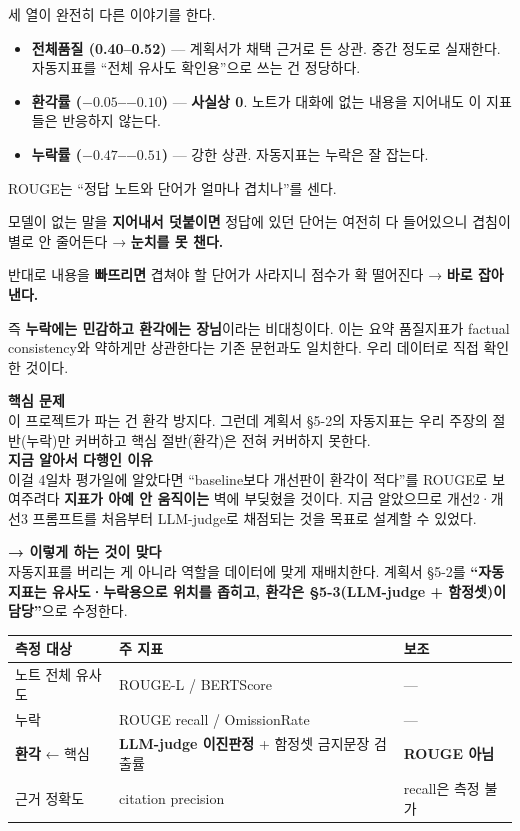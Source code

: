 \documentclass[10.5pt,a4paper]{article}
\newcommand{\proposal}[1]{%
\begin{tcolorbox}[enhanced, breakable, colback=softgray, boxrule=0pt, frame hidden,
  borderline west={3pt}{0pt}{navy}, arc=0pt,
  left=12pt, right=10pt, top=8pt, bottom=8pt, before skip=12pt, after skip=8pt,
  before upper={\setlength{\parskip}{0.7em}\setlength{\parindent}{0pt}}]
{\bfseries\color{navy}→ 이렇게 하는 것이 맞다}\\[3pt]#1
\end{tcolorbox}}
\newcommand{\keybox}[1]{%
\begin{tcolorbox}[enhanced, breakable, colback=white, boxrule=1pt, colframe=accent, arc=1pt,
  left=11pt, right=10pt, top=8pt, bottom=8pt, before skip=12pt, after skip=8pt,
  before upper={\setlength{\parskip}{0.6em}\setlength{\parindent}{0pt}}]
#1
\end{tcolorbox}}
\newcommand{\hl}[1]{\textbf{\color{accent}#1}}
\newcommand{\yes}{\textcolor{okgreen}{\ding{51}}}
\newcommand{\subhead}[1]{\par\vspace{1.0em}{\bfseries\color{navy}#1}\par\vspace{-0.15em}}
\begin{document}
세 열이 완전히 다른 이야기를 한다.

\begin{itemize}
\item \textbf{전체품질 (0.40--0.52)} — 계획서가 채택 근거로 든 상관. 중간 정도로 실재한다. 자동지표를 ``전체 유사도 확인용''으로 쓰는 건 정당하다. \yes
\item \textbf{환각률 ($-0.05$--$-0.10$)} — \hl{사실상 0}. 노트가 대화에 없는 내용을 지어내도 이 지표들은 반응하지 않는다.
\item \textbf{누락률 ($-0.47$--$-0.51$)} — 강한 상관. 자동지표는 누락은 잘 잡는다.
\end{itemize}

\subhead{왜 이렇게 되는가}

ROUGE는 ``정답 노트와 단어가 얼마나 겹치나''를 센다.

모델이 없는 말을 \textbf{지어내서 덧붙이면} 정답에 있던 단어는 여전히 다 들어있으니 겹침이 별로 안 줄어든다 → \textbf{눈치를 못 챈다.}

반대로 내용을 \textbf{빠뜨리면} 겹쳐야 할 단어가 사라지니 점수가 확 떨어진다 → \textbf{바로 잡아낸다.}

즉 \textbf{누락에는 민감하고 환각에는 장님}이라는 비대칭이다. 이는 요약 품질지표가 factual consistency와 약하게만 상관한다는 기존 문헌과도 일치한다. 우리 데이터로 직접 확인한 것이다.

\keybox{
{\bfseries\color{accent}핵심 문제}\\[3pt]
이 프로젝트가 파는 건 환각 방지다. 그런데 계획서 §5-2의 자동지표는 우리 주장의 절반(누락)만 커버하고 핵심 절반(환각)은 전혀 커버하지 못한다.\\[5pt]
{\bfseries 지금 알아서 다행인 이유}\\[3pt]
이걸 4일차 평가일에 알았다면 ``baseline보다 개선판이 환각이 적다''를 ROUGE로 보여주려다 \textbf{지표가 아예 안 움직이는} 벽에 부딪혔을 것이다. 지금 알았으므로 개선2·개선3 프롬프트를 처음부터 LLM-judge로 채점되는 것을 목표로 설계할 수 있었다.
}

\proposal{
자동지표를 버리는 게 아니라 역할을 데이터에 맞게 재배치한다. 계획서 §5-2를 \textbf{``자동지표는 유사도·누락용으로 위치를 좁히고, 환각은 §5-3(LLM-judge + 함정셋)이 담당''}으로 수정한다.
}

\begin{center}\small
\begin{tabular}{@{}lp{4.6cm}p{2.9cm}@{}}
\toprule
\textbf{측정 대상} & \textbf{주 지표} & \textbf{보조} \\
\midrule
노트 전체 유사도 & ROUGE-L / BERTScore & --- \\
누락 & ROUGE recall / OmissionRate & --- \\
\textbf{환각} ← 핵심 & \textbf{LLM-judge 이진판정} + 함정셋 금지문장 검출률 & \textbf{ROUGE 아님} \\
근거 정확도 & citation precision & recall은 측정 불가 \\
\bottomrule
\end{tabular}
\end{center}
\end{document}
